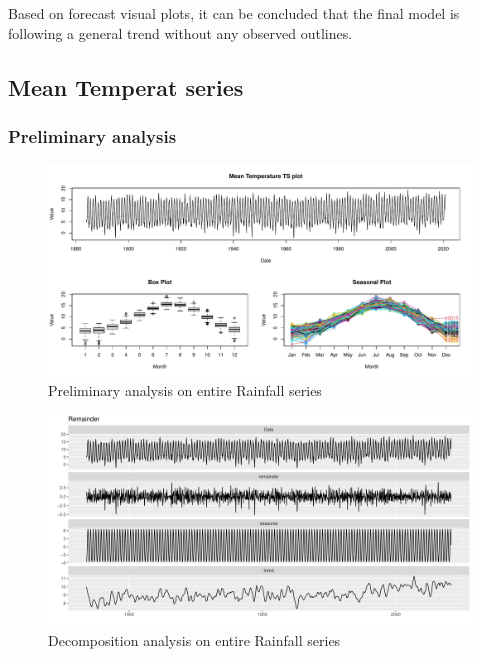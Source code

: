 \documentclass[
  11pt,
]{article}
\begin{document}
Based on forecast visual plots, it can be concluded that the final model
is following a general trend without any observed outlines.

\newpage
\newpage

\hypertarget{mean-temperat-series}{%
\subsection{Mean Temperat series}\label{mean-temperat-series}}

\hypertarget{preliminary-analysis-2}{%
\subsubsection{Preliminary analysis}\label{preliminary-analysis-2}}

\begin{figure}
\centering
\includegraphics{ST422_files/figure-latex/unnamed-chunk-29-1.pdf}
\caption{Preliminary analysis on entire Rainfall series}
\end{figure}

\begin{figure}
\centering
\includegraphics{ST422_files/figure-latex/unnamed-chunk-30-1.pdf}
\caption{Decomposition analysis on entire Rainfall series}
\end{figure}
\end{document}
